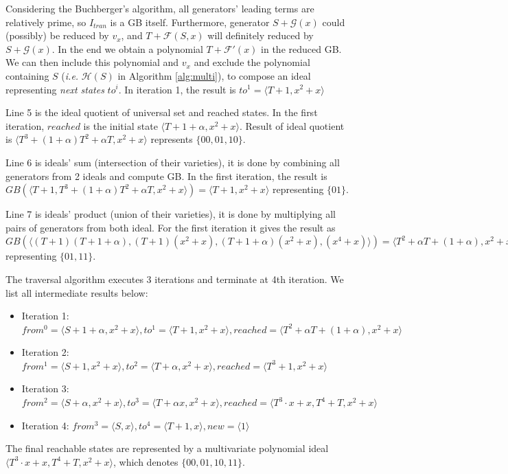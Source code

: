 \begin{Example}
Considering the Buchberger's algorithm, all generators' leading terms are relatively prime, so $I_{tran}$ is a GB itself. 
Furthermore, generator $S + \mathcal G(x)$ could (possibly) be reduced by $v_x$,
and $T+\mathcal F(S,x)$ will definitely reduced by $S + \mathcal G(x)$. In the end we obtain a polynomial
$T + \mathcal F'(x)$ in the reduced GB. We can then include this polynomial and $v_x$ and exclude the polynomial containing
$S$ ({\it i.e.} $\mathcal H(S)$ in Algorithm \ref{alg:multi}), to compose an ideal representing \emph{next states} $to^i$. 
In iteration 1, the result is $to^1 = \langle T+1, x^2+x\rangle$

Line 5 is the ideal quotient of universal set and reached states. In the first iteration, 
$reached$ is the initial state $\langle T+1+\alpha, x^2+x \rangle$. Result of ideal quotient
is $\langle T^3+(1+\alpha)T^2+\alpha T, x^2+x\rangle$ represents $\{00,01,10\}$.

Line 6 is ideals' sum (intersection of their varieties), it is done by combining all generators
from 2 ideals and compute GB. In the first iteration, the result is $GB(\langle T+1,T^3+(1+\alpha)T^2+\alpha T, x^2+x\rangle) = \langle T+1, x^2+x\rangle$ representing $\{01\}$.

Line 7 is ideals' product (union of their varieties), it is done by multiplying all pairs of
generators from both ideal. For the first iteration it gives the result as $GB(\langle (T+1)(T+1+\alpha),
(T+1)(x^2+x), (T+1+\alpha)(x^2+x), (x^4+x)\rangle) = \langle T^2+\alpha T+(1+\alpha), x^2+x\rangle$ representing $\{01,11\}$.

The traversal algorithm executes 3 iterations and terminate at 4th iteration. We list all intermediate 
results below:
\begin{itemize}
\item Iteration 1: $from^0 = \langle S+1+\alpha, x^2+x\rangle, to^1 = \langle T+1, x^2+x\rangle,
 reached = \langle T^2+\alpha T+(1+\alpha), x^2+x\rangle$
\item Iteration 2: $from^1 = \langle S+1, x^2+x\rangle, to^2= \langle T+\alpha, x^2+x\rangle,
reached = \langle T^3+1, x^2+x\rangle$
\item Iteration 3: $from^2 = \langle S+\alpha, x^2+x\rangle, to^3 = \langle T+\alpha x, x^2+x
\rangle, reached = \langle T^3\cdot x+x, T^4+T, x^2+x\rangle$
\item Iteration 4: $from^3 = \langle S, x\rangle, to^4 = \langle T+1, x\rangle, new = \langle1\rangle$
\end{itemize}
The final reachable states are represented by a multivariate polynomial ideal $\langle T^3\cdot x+x, T^4+T, x^2+x\rangle$,
which denotes $\{00,01,10,11\}$.
\end{Example}

